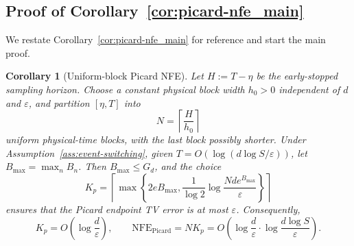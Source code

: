\documentclass{article}
\newtheorem{corollary}{Corollary}[section]
\newcommand{\NFE}{\mathrm{NFE}}
\begin{document}
\subsection{Proof of Corollary~\ref{cor:picard-nfe_main}}
\label{appd:picard_nfe}

We restate Corollary~\ref{cor:picard-nfe_main} for reference and start the main proof.
\begin{corollary}[Uniform-block Picard NFE]
\label{cor:picard-nfe}
Let $H:=T-\eta$ be the early-stopped sampling horizon. Choose a constant physical block width $h_0>0$ independent of $d$ and $\varepsilon$, and partition $[\eta,T]$ into
\[
N=\left\lceil \frac{H}{h_0}\right\rceil
\]
uniform physical-time blocks, with the last block possibly shorter. Under Assumption~\ref{ass:event-switching}, given $T=O(\log(d\log S/\varepsilon))$, let $B_{\max}=\max_n B_n$. Then $B_{\max}\le G_d$, and the choice
\[
K_p=\left\lceil
\max\left\{2eB_{\max},\frac{1}{\log 2}\log\frac{Nd e^{B_{\max}}}{\varepsilon}\right\}
\right\rceil
\]
ensures that the Picard endpoint TV error is at most $\varepsilon$. Consequently,
\[
K_p=O\left(\log\frac d{\varepsilon}\right),
\qquad
\NFE_{\mathrm{Picard}}=NK_p=O\left(\log\frac d{\varepsilon}\cdot \log\frac {d\log S}{\varepsilon} \right).
\]
\end{corollary}
\end{document}
